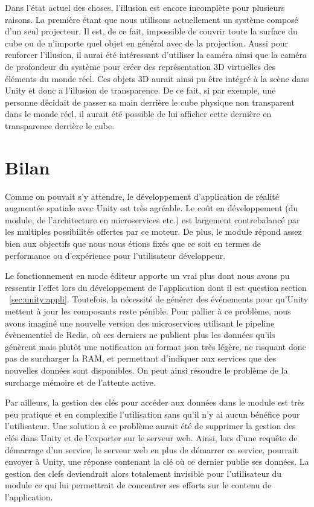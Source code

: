 Dans l'état actuel des choses, l'illusion est encore incomplète pour plusieurs raisons. La première étant que nous utilisons actuellement un système composé d'un seul projecteur. Il est, de ce fait, impossible de couvrir toute la surface du cube ou de n'importe quel objet en général avec de la projection. Aussi pour renforcer l'illusion, il aurai été intéressant d'utiliser la caméra ainsi que la caméra de profondeur du système pour créer des représentation 3D virtuelles des éléments du monde réel. Ces objets 3D aurait ainsi pu être intégré à la scène dans Unity et donc a l'illusion de transparence. De ce fait, si par exemple, une personne décidait de passer sa main derrière le cube physique non transparent dans le monde réel, il aurait été possible de lui afficher cette dernière en transparence derrière le cube.

\section{Bilan}
Comme on pouvait s'y attendre, le développement d'application de réalité augmentée spatiale avec Unity est très agréable. Le coût en développement (du module, de l'architecture en microservices etc.) est largement contrebalancé par les multiples possibilités offertes par ce moteur. De plus, le module répond assez bien aux objectifs que nous nous étions fixés que ce soit en termes de performance ou d'expérience pour l'utilisateur développeur.

Le fonctionnement en mode éditeur apporte un vrai plus dont nous avons pu ressentir l'effet lors du développement de l'application dont il est question section ~\ref{sec:unity:appli}. Toutefois, la nécessité de générer des événements pour qu'Unity mettent à jour les composants reste pénible. Pour pallier à ce problème, nous avons imaginé une nouvelle version des microservices utilisant le pipeline évènementiel de Redis, où ces derniers ne publient plus les données qu'ils génèrent mais plutôt une notification au format json très légère, ne risquant donc pas de surcharger la RAM, et permettant d'indiquer aux services que des nouvelles données sont disponibles. On peut ainsi résoudre le problème de la surcharge mémoire et de l'attente active.

Par ailleurs, la gestion des clés pour accéder aux données dans le module est très peu pratique et en complexifie l'utilisation sans qu'il n'y ai aucun bénéfice pour l'utilisateur. Une solution à ce problème aurait été de supprimer la gestion des clés dans Unity et de l'exporter sur le serveur web. Ainsi, lors d'une requête de démarrage d'un service, le serveur web en plus de démarrer ce service, pourrait envoyer à Unity, une réponse contenant la clé où ce dernier publie ses données. La gestion des clefs deviendrait alors totalement invisible pour l'utilisateur du module ce qui lui permettrait de concentrer ses efforts sur le contenu de l'application.